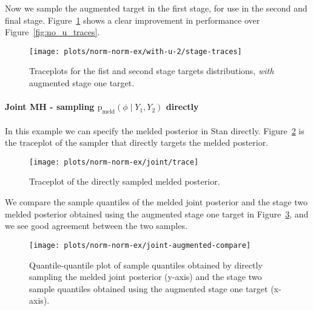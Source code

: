\documentclass[10pt,a4paper,]{article}
\let\oldparagraph\paragraph
\renewcommand{\paragraph}[1]{\oldparagraph{#1}\mbox{}}
\newcommand{\pd}{\text{p}}
\newcommand{\pmeld}{\pd_{\text{meld}}}
\begin{document}
Now we sample the augmented target in the first stage, for use in the
second and final stage. Figure~\ref{fig:with_u_traces_2} shows a clear
improvement in performance over Figure~\ref{fig:no_u_traces}.

\begin{figure}

{\centering \texttt{[image: plots/norm-norm-ex/with-u-2/stage-traces]} 

}

\caption{Traceplots for the fist and second stage targets distributions, \textit{with} augmented stage one target.}\label{fig:with_u_traces_2}
\end{figure}

\paragraph{\texorpdfstring{Joint MH - sampling
\(\pmeld(\phi \mid Y_{1}, Y_{2})\)
directly}{Joint MH - sampling \textbackslash{}pmeld(\textbackslash{}phi \textbackslash{}mid Y\_\{1\}, Y\_\{2\}) directly}}\label{joint-mh---sampling-pmeldphi-mid-y_1-y_2-directly}

In this example we can specify the melded posterior in Stan directly.
Figure~\ref{fig:joint_trace} is the traceplot of the sampler that
directly targets the melded posterior.

\begin{figure}

{\centering \texttt{[image: plots/norm-norm-ex/joint/trace]} 

}

\caption{Traceplot of the directly sampled melded posterior.}\label{fig:joint_trace}
\end{figure}

We compare the sample quantiles of the melded joint posterior and the
stage two melded posterior obtained using the augmented stage one target
in Figure~\ref{fig:joint_augmented_compare}, and we see good agreement
between the two samples.

\begin{figure}

{\centering \texttt{[image: plots/norm-norm-ex/joint-augmented-compare]} 

}

\caption{Quantile-quantile plot of sample quantiles obtained by directly sampling the melded joint posterior (y-axis) and the stage two sample quantiles obtained using the augmented stage one target (x-axis).}\label{fig:joint_augmented_compare}
\end{figure}
\end{document}
